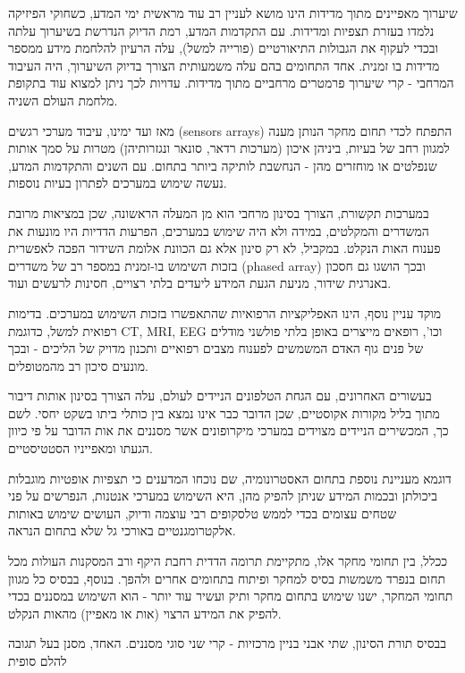 שיערוך מאפיינים מתוך מדידות הינו מושא לעניין רב עוד מראשית ימי המדע, כשחוקי הפיזיקה נלמדו בעזרת תצפיות ומדידות.
עם התקדמות המדע, רמת הדיוק הנדרשת בשיערוך עלתה ובכדי לעקוף את הגבולות התיאורטיים (פורייה למשל), עלה הרעיון להלחמת מידע ממספר מדידות בו זמנית.
אחד התחומים בהם עלה משמעותית הצורך בדיוק השיערוך, היה העיבוד המרחבי - קרי שיערוך פרמטרים מרחביים מתוך מדידות. 
עדויות לכך ניתן למצוא עוד בתקופת מלחמת העולם השניה.
\par
מאז ועד ימינו, עיבוד מערכי רגשים
\textenglish{(sensors arrays)}
התפתח לכדי תחום מחקר הנותן מענה למגוון רחב של בעיות, ביניהן איכון (מערכות רדאר, סונאר ונגזרותיהן) מטרות על סמך אותות שנפלטים או מוחזרים מהן - הנחשבת לותיקה ביותר בתחום.
עם השנים והתקדמות המדע, נעשה שימוש במערכים לפתרון בעיות נוספות.
\par
במערכות תקשורת, הצורך בסינון מרחבי הוא מן המעלה הראשונה, שכן במציאות מרובת המשדרים והמקלטים, במידה ולא היה שימוש במערכים, הפרעות הדדיות היו מונעות את פענוח האות הנקלט. במקביל, לא רק סינון אלא גם הכוונת אלומת השידור הפכה לאפשרית בזכות השימוש בו-זמנית במספר רב של משדרים
\textenglish{(phased array)}
ובכך הושגו גם חסכון באנרגית שידור, מניעת הגעת המידע ליעדים בלתי רצויים, חסינות לרעשים ועוד.
\par
מוקד עניין נוסף, הינו האפליקציות הרפואיות שהתאפשרו בזכות השימוש במערכים. 
בדימות רפואית למשל, כדוגמת 
\textenglish{CT, MRI, EEG}
וכו', רופאים מייצרים באופן בלתי פולשני מודלים של פנים גוף האדם המשמשים לפענוח מצבים רפואיים ותכנון מדויק של הליכים - ובכך מונעים סיכון רב מהמטופלים.
\par
בעשורים האחרונים, עם הגחת הטלפונים הניידים לעולם, עלה הצורך בסינון אותות דיבור מתוך בליל מקורות אקוסטיים, שכן הדובר כבר אינו נמצא בין כותלי ביתו בשקט יחסי.
לשם כך, המכשירים הניידים מצוידים במערכי מיקרופונים אשר מסננים את אות הדובר על פי כיוון הגעתו ומאפייניו הסטטיסטיים.
\par
דוגמא מעניינת נוספת בתחום האסטרונומיה, שם נוכחו המדענים כי תצפיות אופטיות מוגבלות ביכולתן ובכמות המידע שניתן להפיק מהן, היא השימוש במערכי אנטנות, הנפרשים על פני שטחים עצומים בכדי לממש טלסקופים רבי עוצמה ודיוק, העושים שימוש באותות אלקטרומגנטיים באורכי גל שלא בתחום הנראה.
\par
ככלל, בין תחומי מחקר אלו, מתקיימת תרומה הדדית רחבת היקף ורב המסקנות העולות מכל תחום בנפרד משמשות בסיס למחקר ופיתוח בתחומים אחרים ולהפך. 
בנוסף, בבסיס כל מגוון תחומי המחקר, ישנו שימוש בתחום מחקר ותיק ועשיר עוד יותר - הוא השימוש במסננים בכדי להפיק את המידע הרצוי (אות או מאפיין) מהאות הנקלט.  
\par
בבסיס תורת הסינון, שתי אבני בניין מרכזיות - קרי שני סוגי מסננים.
האחד, מסנן בעל תגובה להלם סופית 
